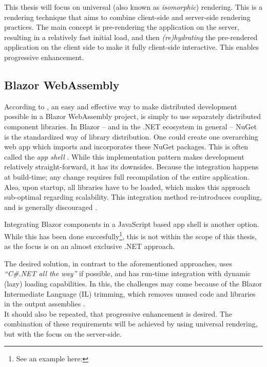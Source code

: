 This thesis will focus on universal (also known as \textit{isomorphic})
rendering. This is a rendering technique that aims to combine client-side and
server-side rendering practices. The main concept is pre-rendering the
application on the server, resulting in a relatively fast initial load, and then
\textit{(re)hydrating} the pre-rendered application on the client side to make
it fully client-side interactive. This enables progressive enhancement.
\autocite{MillerOsmani_2019}

\subsection{Blazor WebAssembly}
According to \textcite{Rappl_MunichNETMeetup_2020}, an easy and effective way to
make distributed development possible in a Blazor WebAssembly project, is simply
to use separately distributed component libraries. In Blazor -- and in the .NET
ecosystem in general -- NuGet is the
standardized way of library distribution. One could create one overarching web
app which imports and incorporates these NuGet packages. This is often called
the \textit{app shell} \autocite{Geers_2020}. While this implementation pattern
makes development relatively straight-forward, it has its downsides. Because the
integration happens at build-time; any change requires full recompilation of the
entire application. Also, upon startup, all libraries have to be loaded, which
makes this approach sub-optimal regarding scalability. This integration method
re-introduces coupling, and is generally discouraged \autocite{Jackson_2019}.

Integrating Blazor components in a JavaScript based app shell is another option.
While this has been done succesfully\footnote{See an example here:
}, this is
not within the scope of this thesis, as the focus is on an almost exclusive .NET
approach.

The desired solution, in contrast to the aforementioned approaches, uses
\textit{``C\#.NET all the way''} if possible, and has run-time integration with
dynamic (lazy) loading capabilities. In this, the challenges may come because of
the Blazor Intermediate Language (IL) trimming, which removes unused code and
libraries in the output assemblies \autocite{Latham_2020}. \\
It should also be repeated, that progressive enhancement is desired. The
combination of these requirements will be achieved by using universal rendering,
but with the focus on the server-side.




